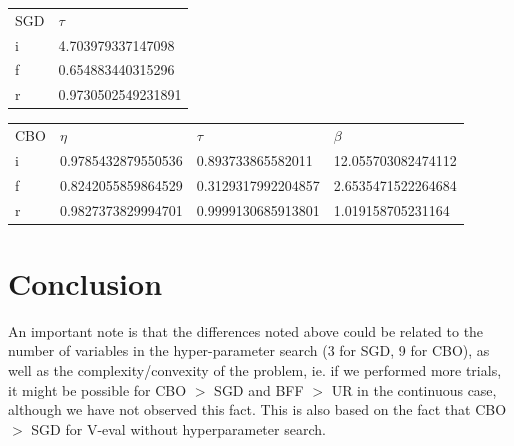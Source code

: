 \documentclass[11pt]{article}
\begin{document}
\begin{tabular}[]{@{}ll@{}}
SGD & $\tau$\\
i & 4.703979337147098\\
f & 0.654883440315296\\
r & 0.9730502549231891
\end{tabular}

\begin{tabular}[]{@{}llll@{}}
CBO & $\eta$ & $\tau$ & $\beta$\\
i & 0.9785432879550536 & 0.893733865582011 &
12.055703082474112\\
f & 0.8242055859864529 & 0.3129317992204857 &
2.6535471522264684\\
r & 0.9827373829994701 & 0.9999130685913801 &
1.019158705231164
\end{tabular}


\section{Conclusion}

An important note is that the differences noted above could be related
to the number of variables in the hyper-parameter search (3 for SGD, 9
for CBO), as well as the complexity/convexity of the problem, ie. if we
performed more trials, it might be possible for CBO $>$ SGD
and BFF $>$ UR in the continuous case, although we have not
observed this fact. This is also based on the fact that CBO
$>$ SGD for V-eval without hyperparameter search.
\end{document}
